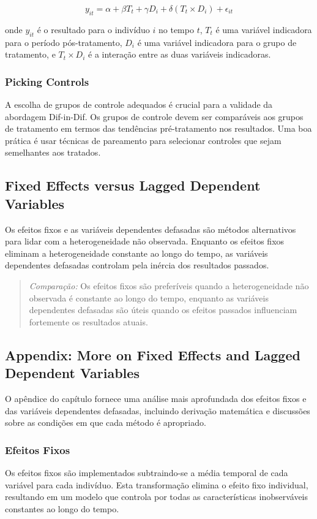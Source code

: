 \documentclass[a4paper,12pt]{article}[abntex2]
\begin{document}
\begin{equation}
y_{it} = \alpha + \beta T_t + \gamma D_i + \delta (T_t \times D_i) + \epsilon_{it}
\end{equation}

onde \( y_{it} \) é o resultado para o indivíduo \( i \) no tempo \( t \), \( T_t \) é uma variável indicadora para o período pós-tratamento, \( D_i \) é uma variável indicadora para o grupo de tratamento, e \( T_t \times D_i \) é a interação entre as duas variáveis indicadoras.

\subsubsection{Picking Controls}
A escolha de grupos de controle adequados é crucial para a validade da abordagem Dif-in-Dif. Os grupos de controle devem ser comparáveis aos grupos de tratamento em termos das tendências pré-tratamento nos resultados. Uma boa prática é usar técnicas de pareamento para selecionar controles que sejam semelhantes aos tratados.

\subsection{Fixed Effects versus Lagged Dependent Variables}
Os efeitos fixos e as variáveis dependentes defasadas são métodos alternativos para lidar com a heterogeneidade não observada. Enquanto os efeitos fixos eliminam a heterogeneidade constante ao longo do tempo, as variáveis dependentes defasadas controlam pela inércia dos resultados passados.

\begin{quote}
\textit{Comparação:} Os efeitos fixos são preferíveis quando a heterogeneidade não observada é constante ao longo do tempo, enquanto as variáveis dependentes defasadas são úteis quando os efeitos passados influenciam fortemente os resultados atuais.
\end{quote}

\subsection{Appendix: More on Fixed Effects and Lagged Dependent Variables}
O apêndice do capítulo fornece uma análise mais aprofundada dos efeitos fixos e das variáveis dependentes defasadas, incluindo derivação matemática e discussões sobre as condições em que cada método é apropriado.

\subsubsection{Efeitos Fixos}
Os efeitos fixos são implementados subtraindo-se a média temporal de cada variável para cada indivíduo. Esta transformação elimina o efeito fixo individual, resultando em um modelo que controla por todas as características inobserváveis constantes ao longo do tempo.
\end{document}
